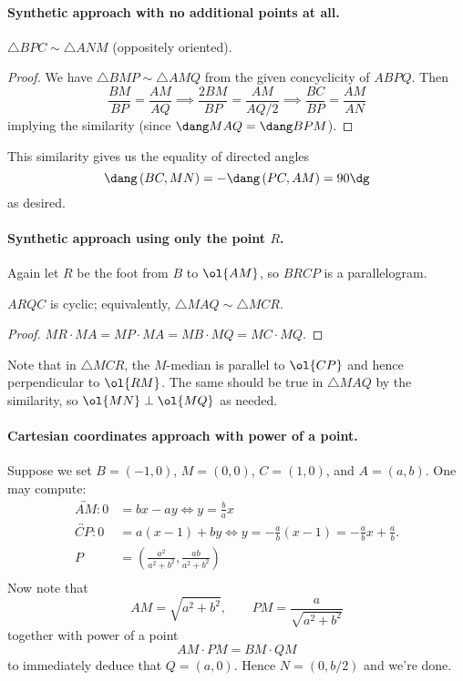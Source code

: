 \documentclass[11pt]{scrartcl}
\begin{document}
\paragraph{Synthetic approach with no additional points at all.}
\begin{claim*}
  $\triangle BPC \sim \triangle ANM$ (oppositely oriented).
\end{claim*}
\begin{proof}
  We have $\triangle BMP \sim \triangle AMQ$ from the given concyclicity of $ABPQ$.
  Then
  \[ \frac{BM}{BP} = \frac{AM}{AQ} \implies
    \frac{2BM}{BP} = \frac{AM}{AQ/2} \implies
    \frac{BC}{BP} = \frac{AM}{AN} \]
  implying the similarity (since $\dang MAQ = \dang BPM$).
\end{proof}
This similarity gives us the equality of directed angles
\[ \dang \left( BC, MN \right) = -\dang \left( PC, AM  \right) = 90\dg \]
as desired.

\paragraph{Synthetic approach using only the point $R$.}
Again let $R$ be the foot from $B$ to $\ol{AM}$, so $BRCP$ is a parallelogram.
\begin{claim*}
  $ARQC$ is cyclic; equivalently, $\triangle MAQ \sim \triangle MCR$.
\end{claim*}
\begin{proof}
  $MR \cdot MA = MP \cdot MA = MB \cdot MQ = MC \cdot MQ$.
\end{proof}

Note that in $\triangle MCR$, the $M$-median is parallel to $\ol{CP}$
and hence perpendicular to $\ol{RM}$.
The same should be true in $\triangle MAQ$ by the similarity,
so $\ol{MN} \perp \ol{MQ}$ as needed.

\paragraph{Cartesian coordinates approach with power of a point.}
Suppose we set $B = (-1,0)$, $M = (0,0)$, $C = (1,0)$, and $A = (a,b)$.
One may compute:
\begin{align*}
  \overleftrightarrow{AM} : 0 &= bx - ay \iff y = \frac ba x \\
  \overleftrightarrow{CP} : 0 &= a(x-1) + by
    \iff y = -\frac ab (x-1) = -\frac ab x + \frac ab. \\
  P &= \left( \frac{a^2}{a^2+b^2}, \frac{ab}{a^2+b^2} \right) \\
\end{align*}
Now note that
\[ AM = \sqrt{a^2+b^2}, \qquad PM = \frac{a}{\sqrt{a^2+b^2}} \]
together with power of a point
\[ AM \cdot PM = BM \cdot QM \]
to immediately deduce that $Q = (a,0)$.
Hence $N = (0, b/2)$ and we're done.
\end{document}
